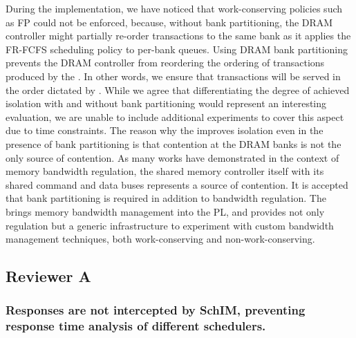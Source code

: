         During the implementation, we have noticed that
        work-conserving policies such as FP could not be enforced,
        because, without bank partitioning, the DRAM controller might
        partially re-order transactions to the same bank as it applies
        the FR-FCFS scheduling policy to per-bank queues. Using DRAM
        bank partitioning prevents the DRAM controller from reordering
        the ordering of transactions produced by the \schim.  In other
        words, we ensure that transactions will be served in the order
        dictated by \schim. While we agree that differentiating the
        degree of achieved isolation with and without bank
        partitioning would represent an interesting evaluation, we are
        unable to include additional experiments to cover this aspect
        due to time constraints. The reason why the \schim improves
        isolation even in the presence of bank partitioning is that
        contention at the DRAM banks is not the only source of
        contention. As many works have demonstrated in the context of
        memory bandwidth regulation, the shared memory controller
        itself with its shared command and data buses represents a
        source of contention. It is accepted that bank partitioning is
        required in addition to bandwidth regulation. The \schim
        brings memory bandwidth management into the PL, and provides
        not only regulation but a generic infrastructure to experiment
        with custom bandwidth management techniques, both
        work-conserving and non-work-conserving.


    \subsection{Reviewer A}

        \subsubsection{Responses are not intercepted by SchIM,
        preventing response time analysis of different schedulers.}

